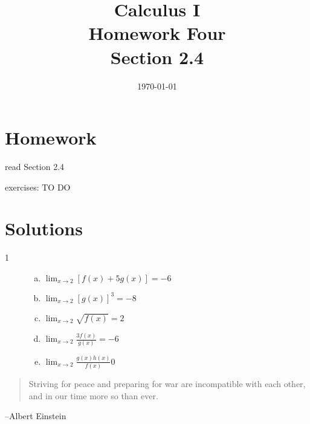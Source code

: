 \documentclass[letterpaper]{exam}
\title{Calculus I \\ Homework Four \\ Section 2.4}
\author{}
\date{\today}
\begin{document}
  \maketitle

  \section{Homework}
    \begin{itemize*}
      \item read Section 2.4
      \item exercises: TO DO
    \end{itemize*}

  \ifprintanswers

    \section{Solutions}

    \begin{description}

      \item[1]
        \begin{enumerate}[(a)]
          \item $\lim_{x \to 2} \left[ f(x) + 5g(x) \right] = \boxed{ -6 }$
          \item $\lim_{x \to 2} \left[ g(x) \right]^3 = \boxed{ -8 }$
          \item $\lim_{x \to 2} \sqrt{f(x)} = \boxed{ 2 }$
          \item $\lim_{x \to 2} \frac{3 f(x)}{g(x)} = \boxed{ -6 }$
          \item $\lim_{x \to 2} \frac{g(x) h(x)}{f(x)} \boxed{ 0 }$ 
        \end{enumerate}

    \end{description}

  \else
    \vspace{11 cm}
    \begin{quote}
      \begin{em}
        Striving for peace and preparing for war are incompatible with each
        other, and in our time more so than ever. 
      \end{em}
    \end{quote}
    \hspace{1 cm} --Albert Einstein
  \fi
\end{document}
